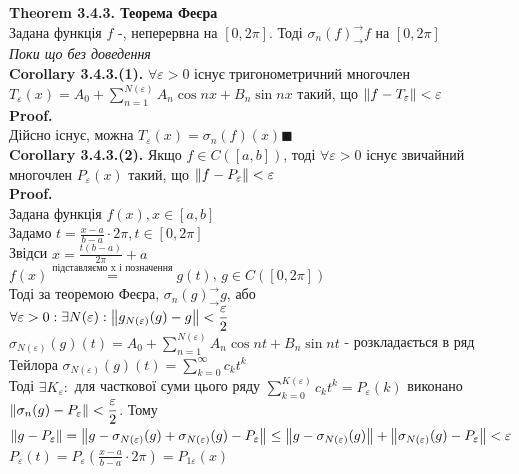\documentclass[a4paper, 14pt]{extarticle}
\def\hugespace{\vspace{5mm} \\}
\begin{document}
\textbf{Theorem 3.4.3. Теорема Феєра}\\
Задана функція $f$ -, неперервна на $[0, 2\pi]$. Тоді $\sigma_n(f) ^\rightarrow_\rightarrow f$ на $[0,2\pi]$\\
\textit{Поки що без доведення}
\hugespace
\textbf{Corollary 3.4.3.(1).} $\forall \varepsilon>0$ існує тригонометричний многочлен $\displaystyle T_\varepsilon(x) = A_0 + \sum_{n=1}^{N(\varepsilon)} A_n \cos nx + B_n \sin nx$ такий, що $\norm{f - T_{\varepsilon}}<\varepsilon$\\
\textbf{Proof.}\\
Дійсно існує, можна $T_{\varepsilon}(x) = \sigma_n(f)(x) \blacksquare$
\hugespace
\textbf{Corollary 3.4.3.(2).} Якщо $f \in C([a,b])$, тоді $\forall \varepsilon>0$ існує звичайний многочлен $\displaystyle P_{\varepsilon}(x)$ такий, що $\norm{f-P_{\varepsilon}}<\varepsilon$\\
\textbf{Proof.}\\
Задана функція $f(x), x \in [a,b]$\\
Задамо $\displaystyle t = \frac{x-a}{b-a} \cdot 2\pi, t \in [0, 2\pi]$\\
Звідси $\displaystyle x = \frac{t(b-a)}{2\pi}+a$\\
$\displaystyle f(x) \overset{\textrm{підставляємо x і позначення}}{=} g(t)$, $g \in C([0,2\pi])$\\
Тоді за теоремою Феєра, $\sigma_n(g) ^\rightarrow_\rightarrow g$, або\\
$\displaystyle \forall \varepsilon > 0: \exists N(\varepsilon): \norm{g_{N(\varepsilon)}(g) -g} < \frac{\varepsilon}{2}$\\
$\displaystyle \sigma_{N(\varepsilon)}(g)(t) = A_0 + \sum_{n=1}^{N(\varepsilon)} A_n \cos nt + B_n \sin nt$ - розкладається в ряд Тейлора
$\displaystyle \sigma_{N(\varepsilon)}(g)(t) = \sum_{k=0}^{\infty} c_k t^k$\\
Тоді $\exists K_{\varepsilon}:$ для часткової суми цього ряду $\displaystyle \sum_{k=0}^{K(\varepsilon)} c_k t^k = P_{\varepsilon}(k)$ виконано $\displaystyle \norm{\sigma_n(g) - P_{\varepsilon}} < \frac{\varepsilon}{2}$. Тому\\
$\norm{g-P_{\varepsilon}} = \norm{g - \sigma_{N(\varepsilon)}(g) + \sigma_{N(\varepsilon)}(g) - P_{\varepsilon}} \leq \norm{g - \sigma_{N(\varepsilon)}(g)} + \norm{\sigma_{N(\varepsilon)}(g) - P_{\varepsilon}} < \varepsilon$\\
$\displaystyle P_{\varepsilon}(t) = P_{\varepsilon}(\frac{x-a}{b-a} \cdot 2\pi) = P_{1\varepsilon}(x)$\\
\end{document}
